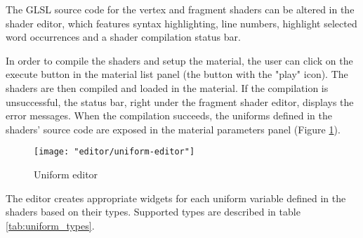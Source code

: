 The GLSL source code for the vertex and fragment shaders can be altered in the shader editor, which features syntax highlighting, line numbers, highlight selected word occurrences and a shader compilation status bar.

In order to compile the shaders and setup the material, the user can click on the execute button in the material list panel (the button with the "play" icon). The shaders are then compiled and loaded in the material. If the compilation is unsuccessful, the status bar, right under the fragment shader editor, displays the error messages. When the compilation succeeds, the uniforms defined in the shaders' source code are exposed in the material parameters panel (Figure \ref{fig:uniform-editor}).

\begin{figure}
    \caption{Uniform editor}
    \begin{center}
        \texttt{[image: "editor/uniform-editor"]}
    \end{center}
    \label{fig:uniform-editor}
\end{figure}

The editor creates appropriate widgets for each uniform variable defined in the shaders based on their types. Supported types are described in table \ref{tab:uniform_types}.

